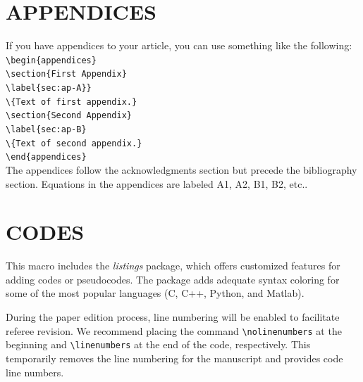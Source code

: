 \documentclass[9pt,article,twoside]{rmaa-rho-class/rmaa-rho}
\newcommand{\CS}[1]{\texttt{\textbackslash #1}}
\begin{document}
\section{APPENDICES}

If you have appendices to your article, you can use something like the following:\\
    
    \noindent\CS{begin}\verb|{appendices}|\\
    \CS{section}\verb|{First Appendix}|\\
    \CS{label}\verb|{sec:ap-A}}|\\
    \CS{}\verb|{Text of first appendix.}|\\
    \CS{section}\verb|{Second Appendix}|\\
    \CS{label}\verb|{sec:ap-B}|\\
    \CS{}\verb|{Text of second appendix.}|\\
    \CS{end}\verb|{appendices}|\\

The appendices follow the acknowledgments section but precede the bibliography section. Equations in the appendices are labeled A1, A2, B1, B2, etc..

\section{CODES}

    This macro includes the \textit{listings} package, which offers customized features for adding codes or pseudocodes. The package adds adequate syntax coloring for some of the most popular languages (C, C++, Python, 
    and Matlab).

    \nolinenumbers
    
    \linenumbers

\vspace{2cm}

    \nolinenumbers
    
    \linenumbers



    \nolinenumbers
    
    \linenumbers

    During the paper edition process, line numbering will be enabled to facilitate referee revision. We recommend placing the command \verb|\nolinenumbers| at the beginning and \verb|\linenumbers| at the end of the code, respectively. This temporarily removes the line numbering for the manuscript and provides code line numbers.
\end{document}
